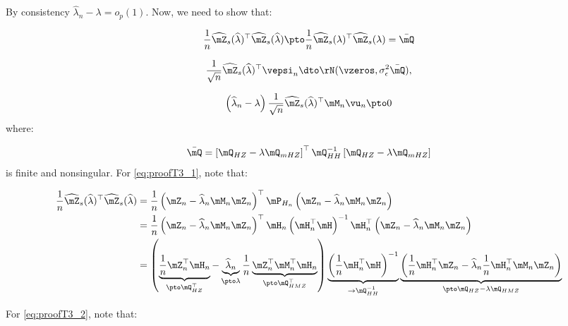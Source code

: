 \documentclass[english,12pt]{book}\usepackage[]{graphicx}\usepackage[]{xcolor}
\begin{document}
\begin{subappendices}
By consistency $\widehat{\lambda}_n- \lambda = o_p(1)$. Now, we need to show that: 

\begin{equation}\label{eq:proofT3_1}
  \frac{1}{n}\widehat{\mZ}_s(\widehat{\lambda})^\top\widehat{\mZ}_s(\widehat{\lambda})\pto \frac{1}{n}\widehat{\mZ}_s(\lambda)^\top\widehat{\mZ}_s(\lambda) = \bar{\mQ}
\end{equation}

\begin{equation}\label{eq:proofT3_2}
  \frac{1}{\sqrt{n}}\widehat{\mZ}_s(\widehat{\lambda})^\top\vepsi_n\dto \rN(\vzeros, \sigma^2_{\epsilon}\bar{\mQ}),
\end{equation}

\begin{equation}\label{eq:proofT3_3}
\left(\widehat{\lambda}_n- \lambda\right)\frac{1}{\sqrt{n}}\widehat{\mZ}_s(\widehat{\lambda})^\top\mM_n\vu_n \pto 0
\end{equation}
%
where:

\begin{equation}
  \bar{\mQ} = \left[\mQ_{HZ} - \lambda \mQ_{mHZ}\right]^\top \mQ_{HH}^{-1}\left[\mQ_{HZ} - \lambda \mQ_{mHZ}\right]
\end{equation}
%
is finite and nonsingular. For \ref{eq:proofT3_1}, note that:

\begin{equation}
\begin{aligned}
  \frac{1}{n}\widehat{\mZ}_s(\widehat{\lambda})^\top\widehat{\mZ}_s(\widehat{\lambda}) & = \frac{1}{n}\left(\mZ_n - \widehat{\lambda}_n\mM_n\mZ_n\right)^\top\mP_{H_n}\left(\mZ_n - \widehat{\lambda}_n\mM_n\mZ_n\right) \\
  & =  \frac{1}{n}\left(\mZ_n - \widehat{\lambda}_n\mM_n\mZ_n\right)^\top\mH_n\left(\mH_n^\top\mH\right)^{-1}\mH_n^\top\left(\mZ_n - \widehat{\lambda}_n\mM_n\mZ_n\right) \\
  & =  \left(\underbrace{\frac{1}{n}\mZ_n^\top \mH_n}_{\pto \mQ_{HZ}^\top} - \underbrace{\widehat{\lambda}_n}_{\pto \lambda}\frac{1}{n}\underbrace{\mZ_n^\top\mM_n^\top\mH_n}_{\pto \mQ_{HMZ}^\top}\right)\underbrace{\left(\frac{1}{n}\mH_n^\top\mH\right)^{-1}}_{\to \mQ_{HH}^{-1}}\underbrace{\left(\frac{1}{n}\mH_n^\top\mZ_n  - \widehat{\lambda}_n\frac{1}{n}\mH_n^\top\mM_n\mZ_n\right)}_{\pto \mQ_{HZ}-\lambda\mQ_{HMZ}}
\end{aligned}
\end{equation}

For \ref{eq:proofT3_2}, note that:


\end{subappendices}
\end{document}
